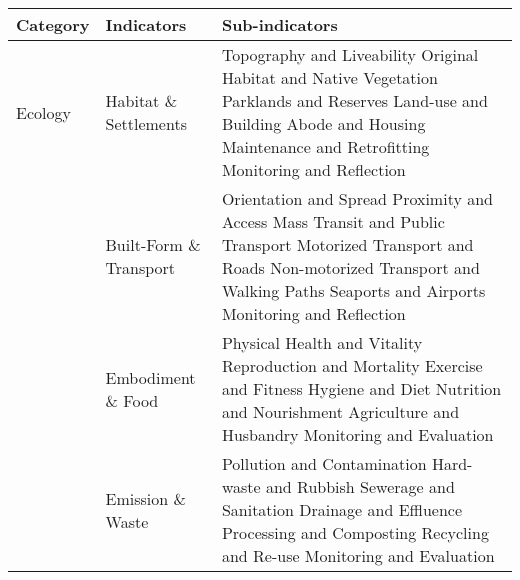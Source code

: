\begin{table}[th]
\begin{center}
\begin{tabular}{ >{\raggedright\arraybackslash}p{} >{\raggedright\arraybackslash}p{} >{\raggedright\arraybackslash}p{} }
\hline
Category & Indicators & Sub-indicators \\
\hline
Ecology & Habitat \& Settlements & Topography and Liveability \linebreak Original Habitat and Native Vegetation \linebreak Parklands and Reserves \linebreak Land-use and Building \linebreak Abode and Housing \linebreak Maintenance and Retrofitting \linebreak Monitoring and Reflection \linebreak \\
  & Built-Form \& Transport & Orientation and Spread \linebreak Proximity and Access \linebreak Mass Transit and Public Transport \linebreak Motorized Transport and Roads \linebreak Non-motorized Transport and Walking Paths \linebreak Seaports and Airports \linebreak Monitoring and Reflection \linebreak \\
  & Embodiment \& Food & Physical Health and Vitality \linebreak Reproduction and Mortality \linebreak Exercise and Fitness \linebreak Hygiene and Diet \linebreak Nutrition and Nourishment \linebreak Agriculture and Husbandry \linebreak Monitoring and Evaluation \linebreak \\
  & Emission \& Waste & Pollution and Contamination \linebreak Hard-waste and Rubbish \linebreak Sewerage and Sanitation \linebreak Drainage and Effluence \linebreak Processing and Composting \linebreak Recycling and Re-use \linebreak Monitoring and Evaluation \linebreak \\

\end{tabular}
\end{center}
\end{table}

